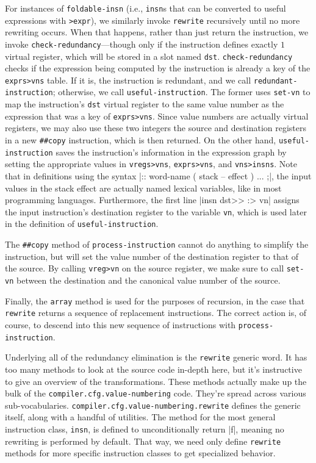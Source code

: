 For instances of \Verb|foldable-insn| (i.e., \Verb|insn|s that can be
converted to useful expressions with \Verb|>expr|), we similarly invoke
\Verb|rewrite| recursively until no more rewriting occurs.  When that
happens, rather than just return the instruction, we invoke
\Verb|check-redundancy|---though only if the instruction defines exactly $1$
virtual register, which will be stored in a slot named \Verb|dst|.
\Verb|check-redundancy| checks if the expression being computed by the
instruction is already a key of the \Verb|exprs>vns| table.  If it is, the
instruction is redundant, and we call \Verb|redundant-instruction|;
otherwise, we call \Verb|useful-instruction|.  The former uses
\Verb|set-vn| to map the instruction's \Verb|dst| virtual register to the
same value number as the expression that was a key of \Verb|exprs>vns|.
Since value numbers are actually virtual registers, we may also use these two
integers the source and destination registers in a new \Verb|##copy|
instruction, which is then returned.  On the other hand,
\Verb|useful-instruction| saves the instruction's information in the
expression graph by setting the appropriate values in \Verb|vregs>vns|,
\Verb|exprs>vns|, and \Verb|vns>insns|.  Note that in definitions using the
syntax
%
\factor|:: word-name ( stack -- effect ) ... ;|,
%
the input values in the stack effect are actually named lexical variables, like
in most programming languages.  Furthermore, the
first line
%
\factor|insn dst>> :> vn|
%
assigns the input instruction's destination register to the variable
\Verb|vn|, which is used later in the definition of
\Verb|useful-instruction|.

The \Verb|##copy| method of \Verb|process-instruction| cannot do anything
to simplify the instruction, but will set the value number of the destination
register to that of the source.  By calling \Verb|vreg>vn| on the source
register, we make sure to call \Verb|set-vn| between the destination and the
canonical value number of the source.

Finally, the \Verb|array| method is used for the purposes of recursion, in
the case that \Verb|rewrite| returns a sequence of replacement instructions.
The correct action is, of course, to descend into this new sequence of
instructions with \Verb|process-instruction|.

Underlying all of the redundancy elimination is the \Verb|rewrite| generic
word.  It has too many methods to look at the source code in-depth here, but
it's instructive to give an overview of the transformations.  These methods
actually make up the bulk of the \Verb|compiler.cfg.value-numbering| code.
They're spread across various sub-vocabularies.
\Verb|compiler.cfg.value-numbering.rewrite| defines the generic itself, along
with a handful of utilities.  The method for the most general instruction
class, \Verb|insn|, is defined to unconditionally return \factor|f|, meaning no
rewriting is performed by default.  That way, we need only define
\Verb|rewrite| methods for more specific instruction classes to get specialized
behavior.

